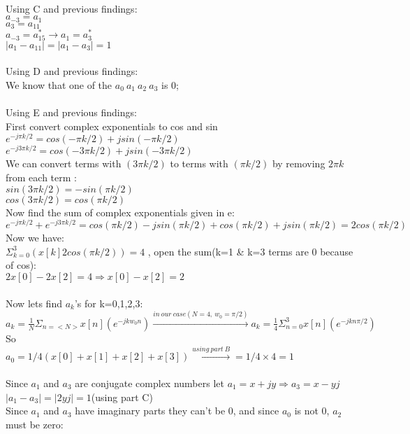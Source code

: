 \documentclass[10pt,a4paper, margin=1in]{article}
\begin{document}
\begin{enumerate}
\\
Using C and previous findings: \\
$a_{-3}=a_1$  \\ 
$a_3=a_{11}$ \\
$a_{-3}=a_{15}^* \longrightarrow a_1=a_3^*  $\\
$|a_1-a_{11}|=|a_1-a_3|=1  $\\
\\
Using D and previous findings: \\
We know that one of the $a_0 \ a_1 \ a_2 \ a_3 $ is 0; \\
\\
Using E and previous findings: \\
First convert complex exponentials to cos and sin \\
$ e^{-j\pi k/2}= cos(-\pi k /2) + jsin(-\pi k /2)$ \\
$ e^{-j3\pi k/2}=cos(-3\pi k/2)+jsin(-3\pi k/2) $ \\
We can convert terms with $(3\pi k/2)$ to terms with $ (\pi k/2)$ by removing $2\pi k$ from each term : \\
$sin(3\pi k/2)=-sin(\pi k/2)$\\
$cos(3\pi k/2)=cos(\pi k/2)$\\
Now find the sum of complex exponentials given in e: \\
$ e^{-j\pi k/2} +  e^{-j3\pi k/2}=cos(\pi k /2)-jsin(\pi k /2)+cos(\pi k /2)+jsin(\pi k /2)=2cos(\pi k /2)$\\
Now we have:\\
$\Sigma_{k=0}^{3}(x[k]2cos(\pi k /2))=4$ , open the sum(k=1 \& k=3 terms are 0 because of cos):\\
$2x[0]-2x[2]=4 \Longrightarrow x[0]-x[2]=2$\\
\\
Now lets find $a_k$'s for k=0,1,2,3:\\
$a_k= \frac{1}{N} \Sigma_{n=<N>}^{} x[n](e^{-jkw_0n}) \xrightarrow{in \ our \ case(N=4, \ w_0=\pi/2)} a_k= \frac{1}{4} \Sigma_{n=0}^{3} x[n](e^{-jkn\pi/2})$\\
So\\
$a_0=1/4(x[0]+x[1]+x[2]+x[3]) \xrightarrow{using\ part\ B} = 1/4 \times 4=1$\\
\\
Since $a_1$ and $a_3$ are conjugate complex numbers let $a_1=x+jy \Longrightarrow a_3=x-yj$\\
$|a_1-a_3|=|2yj|=1$(using part C)\\
Since $a_1$ and $a_3$ have imaginary parts they can't be 0, and since $a_0$ is not 0, $a_2$ must be zero:\\

\end{enumerate}
\end{document}
